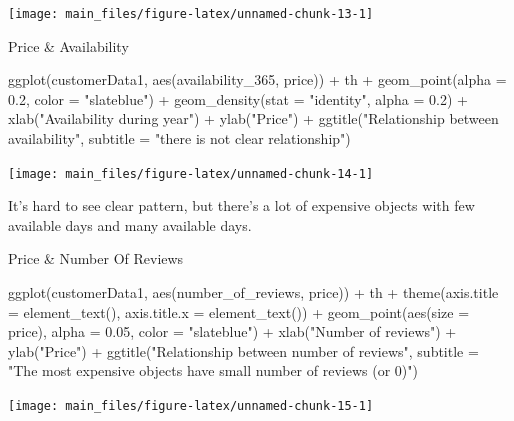 \begin{Schunk}


\begin{center}\texttt{[image: main\_files/figure-latex/unnamed-chunk-13-1]} \end{center}

\end{Schunk}

Price \& Availability

\begin{Schunk}
\begin{Sinput}
ggplot(customerData1, aes(availability_365, price)) +
  th +
  geom_point(alpha = 0.2, color = "slateblue") +
  geom_density(stat = "identity", alpha = 0.2) +
  xlab("Availability during year") +
  ylab("Price") +
  ggtitle("Relationship between availability",
          subtitle = "there is not clear relationship") 
\end{Sinput}


\begin{center}\texttt{[image: main\_files/figure-latex/unnamed-chunk-14-1]} \end{center}

\end{Schunk}

It's hard to see clear pattern, but there's a lot of expensive objects
with few available days and many available days.

Price \& Number Of Reviews

\begin{Schunk}
\begin{Sinput}
ggplot(customerData1, aes(number_of_reviews, price)) +
  th + theme(axis.title = element_text(), axis.title.x = element_text()) +
  geom_point(aes(size = price), alpha = 0.05, color = "slateblue") +
  xlab("Number of reviews") +
  ylab("Price") +
  ggtitle("Relationship between number of reviews",
          subtitle = "The most expensive objects have small number of reviews (or 0)")
\end{Sinput}


\begin{center}\texttt{[image: main\_files/figure-latex/unnamed-chunk-15-1]} \end{center}

\end{Schunk}

